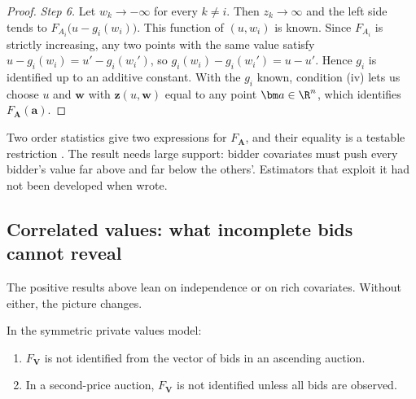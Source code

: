 \begin{proof}
\emph{Step 6.} Let $w_k\to-\infty$ for every $k\neq i$. Then $z_k\to\infty$ and the left side tends to
$F_{A_i}\big(u-g_i(w_i)\big)$. This function of $(u,w_i)$ is known. Since $F_{A_i}$ is strictly increasing, any two
points with the same value satisfy $u-g_i(w_i)=u'-g_i(w_i')$, so $g_i(w_i)-g_i(w_i')=u-u'$. Hence $g_i$ is identified
up to an additive constant. With the $g_i$ known, condition (iv) lets us choose $u$ and $\bm w$ with
$\bm z(u,\bm w)$ equal to any point $\bm a\in\R^n$, which identifies $F_{\bm A}(\bm a)$.
\end{proof}

Two order statistics give two expressions for $F_{\bm A}$, and their equality is a testable restriction
\citep[Theorem~5(ii)]{AtheyHaile2002}. The result needs large support: bidder covariates must push every bidder's
value far above and far below the others'. Estimators that exploit it had not been developed when
\citet[Section~6.2.1]{AtheyHaile2007} wrote.

\subsection{Correlated values: what incomplete bids cannot reveal}\label{sec:15-nonid}

The positive results above lean on independence or on rich covariates. Without either, the picture changes.

\begin{theorem}\label{thm:15-ah4}
In the symmetric private values model:
\begin{enumerate}[label=(\roman*)]
\item $F_{\bm V}$ is not identified from the vector of bids in an ascending auction.
\item In a second-price auction, $F_{\bm V}$ is not identified unless all bids are observed.
\end{enumerate}
\end{theorem}

